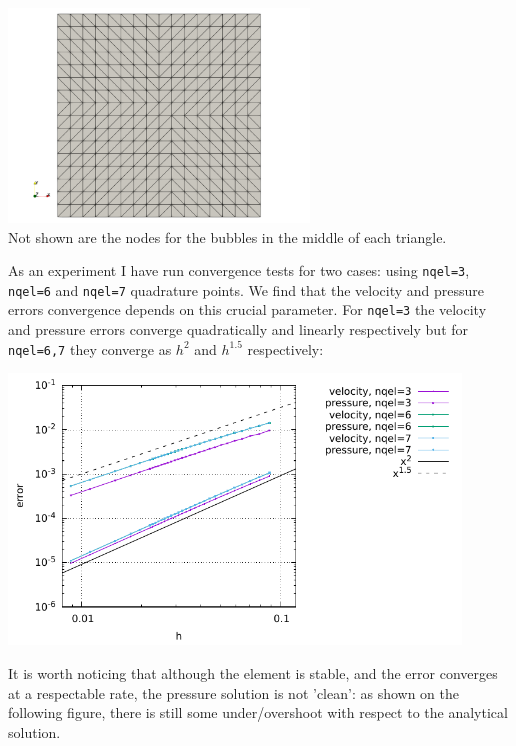 \begin{center}
\includegraphics[width=8cm]{python_codes/fieldstone_47/images/mesh16x16.png}\\
Not shown are the nodes for the bubbles in the middle of each triangle. 
\end{center}

As an experiment I have run convergence tests for two cases: using {\tt nqel=3},  
{\tt nqel=6} and {\tt nqel=7} quadrature points.
We find that the velocity and pressure errors convergence depends on this crucial parameter. 
For {\tt nqel=3} the velocity and pressure errors converge quadratically and linearly respectively
but for {\tt nqel=6,7} they converge as $h^2$ and $h^{1.5}$ respectively:

\begin{center}
\includegraphics[width=12cm]{python_codes/fieldstone_47/results/reg/errors}
\end{center}

It is worth noticing that although the element is stable, and the error converges
at a respectable rate, the pressure solution is not 'clean': as shown on the 
following figure, there is still some under/overshoot with respect to the analytical solution.

